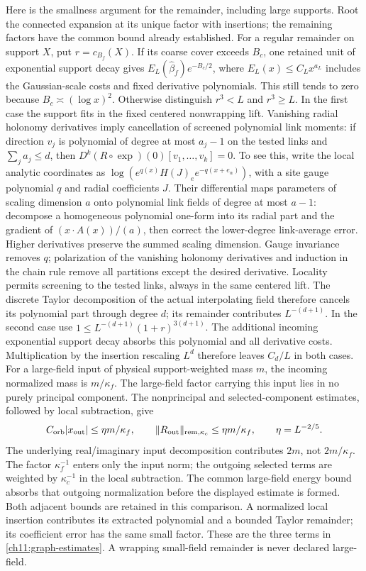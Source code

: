 Here is the smallness argument for the remainder, including large
supports. Root the connected expansion at its unique factor with insertions;
the remaining factors have the common bound already established.
For a regular remainder on support $X$, put $r=c_{B_f}(X)$.
If its coarse cover exceeds $B_c$, one retained unit of exponential support decay gives
$E_L(\widehat\beta_f)e^{-B_c/2}$, where $E_L(x)\le C_Lx^{a_L}$ includes the Gaussian-scale costs and fixed derivative polynomials. This still tends to zero because $B_c\asymp(\log x)^2$.
Otherwise distinguish $r^3<L$ and $r^3\ge L$.
In the first case the support fits in the fixed centered nonwrapping
lift. Vanishing radial holonomy derivatives imply cancellation of screened
polynomial link moments: if direction $v_j$ is polynomial of degree
at most $a_j-1$ on the tested links and $\sum_j a_j\le d$, then
$D^k(R\circ\exp)(0)[v_1,\ldots,v_k]=0$.
To see this, write the local analytic coordinates as
$\log(e^{q(x)}H(J)_e e^{-q(x+e_\alpha)})$, with a site gauge
polynomial $q$ and radial coefficients $J$.
Their differential maps parameters of scaling dimension $a$ onto polynomial link
fields of degree at most $a-1$: decompose a homogeneous polynomial
one-form into its radial part and the gradient of
$(x\cdot A(x))/(a)$, then correct the lower-degree link-average error.
Higher derivatives preserve the summed scaling dimension.
Gauge invariance removes $q$; polarization of the vanishing holonomy derivatives and induction in the chain rule remove all partitions except
the desired derivative. Locality permits screening to the tested
links, always in the same centered lift.
The discrete Taylor decomposition of the actual interpolating field
therefore cancels its polynomial part through degree $d$; its
remainder contributes $L^{-(d+1)}$.
In the second case use
$1\le L^{-(d+1)}(1+r)^{3(d+1)}$.
The additional incoming exponential support decay absorbs this polynomial and
all derivative costs. Multiplication by the insertion rescaling $L^d$
therefore leaves $C_d/L$ in both cases.
For a large-field input of physical support-weighted mass $m$,
the incoming normalized mass is $m/\kappa_f$. The large-field factor carrying this input lies in no purely
principal component. The nonprincipal and selected-component estimates,
followed by local subtraction, give
\[
 C_{\rm orb}|x_{\rm out}|\le\eta m/\kappa_f,\qquad
 \|R_{\rm out}\|_{{\rm rem},\kappa_c}\le\eta m/\kappa_f,
 \qquad \eta=L^{-2/5}.
\]
The underlying real/imaginary input decomposition contributes $2m$, not
$2m/\kappa_f$. The factor $\kappa_f^{-1}$ enters only the input norm;
the outgoing selected terms are weighted by $\kappa_c^{-1}$ in the
local subtraction. The common large-field energy bound absorbs that
outgoing normalization before the displayed estimate is formed.
Both adjacent bounds are retained in this comparison.
A normalized local insertion contributes its extracted polynomial and a bounded
Taylor remainder; its coefficient error has the same small factor.
These are the three terms in \eqref{ch11:graph-estimates}.
A wrapping small-field remainder is never declared large-field.

